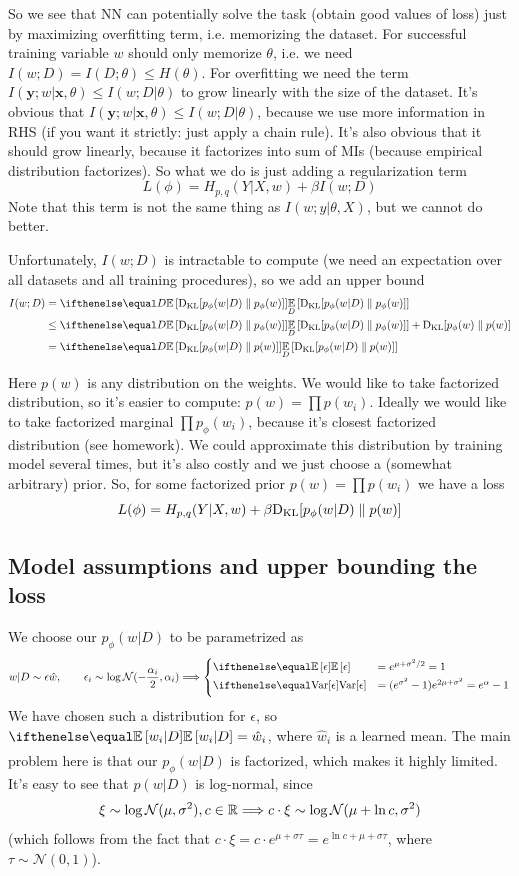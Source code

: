 \documentclass{article}
\begin{document}
So we see that NN can potentially solve the task (obtain good values of loss) just by maximizing overfitting term, i.e. memorizing the dataset.
For successful training variable $w$ should only memorize $\theta$, i.e. we need $I(w;D) = I(D;\theta) \leq H(\theta)$.
For overfitting we need the term $I(\bm y; w | \bm x, \theta) \leq I(w; D | \theta)$ to grow linearly with the size of the dataset.
It's obvious that $I(\bm y; w | \bm x, \theta) \leq I(w; D | \theta)$, because we use more information in RHS (if you want it strictly: just apply a chain rule).
It's also obvious that it should grow linearly, because it factorizes into sum of MIs (because empirical distribution factorizes).
So what we do is just adding a regularization term
\[
L(\phi) = H_{p,q}(Y|X,w) + \beta I(w;D)
\]
Note that this term is not the same thing as $I(w;y|\theta, X)$, but we cannot do better.

Unfortunately, $I(w;D)$ is intractable to compute (we need an expectation over all datasets and all training procedures), so we add an upper bound
\begin{equation}
\begin{split}
I(w; D) &= \expect[D]{\kl{p_\phi(w|D)}{p_\phi(w)}}
\\
&\leq \expect[D]{\kl{p_\phi(w|D)}{p_\phi(w)}} + \kl{p_\phi(w)}{p(w)}
\\
&= \expect[D]{\kl{p_\phi(w|D)}{p(w)}}
\end{split}
\end{equation}

Here $p(w)$ is any distribution on the weights.
We would like to take factorized distribution, so it's easier to compute: $p(w) = \prod p(w_i)$.
Ideally we would like to take factorized marginal $\prod p_\phi(w_i)$, because it's closest factorized distribution (see homework).
We could approximate this distribution by training model several times, but it's also costly and we just choose a (somewhat arbitrary) prior.
So, for some factorized prior $p(w) = \prod p(w_i)$ we have a loss
\[
L(\phi) = H_{p,q}(Y|X,w) + \beta \text{D}_\text{KL}[p_\phi(w|D) \parallel p(w)]
\]

\subsection*{Model assumptions and upper bounding the loss}
We choose our $p_\phi(w|D)$ to be parametrized as
\[
w|D \sim \epsilon \hat w, \qquad \epsilon_i \sim \log \mathcal{N}(-\frac{\alpha_i}{2}, \alpha_i)
\Longrightarrow
\begin{cases}
\expect{\epsilon} &= e^{\mu + \sigma^2/2} = 1 \\
\var{\epsilon} &= (e^{\sigma^2} - 1)e^{2\mu + \sigma^2} = e^\alpha - 1
\end{cases}
\]
We have chosen such a distribution for $\epsilon$, so $\expect{w_i|D} = \hat w_i$, where $\hat w_i$ is a learned mean.
The main problem here is that our $p_\phi(w|D)$ is factorized, which makes it highly limited.
It's easy to see that $p(w|D)$ is log-normal, since
\[
\xi \sim \log \mathcal{N}(\mu, \sigma^2), c \in \mathbb{R} \Longrightarrow c \cdot \xi \sim \log \mathcal{N}(\mu + \ln c, \sigma^2)
\]
(which follows from the fact that $c\cdot\xi = c\cdot e^{\mu + \sigma \tau} = e^{\ln c + \mu + \sigma \tau}$, where $\tau \sim \mathcal{N}(0, 1)$).
\end{document}
